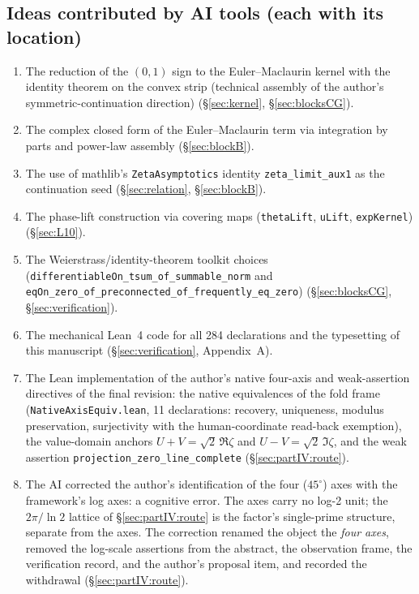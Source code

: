\documentclass{article}
\newcommand{\zt}{\zeta}
\begin{document}
\subsection*{Ideas contributed by AI tools (each with its location)}
\begin{enumerate}
\item The reduction of the $(0,1)$ sign to the Euler--Maclaurin kernel with
the identity theorem on the convex strip (technical assembly of the
author's symmetric-continuation direction) (\S\ref{sec:kernel},
\S\ref{sec:blocksCG}).
\item The complex closed form of the Euler--Maclaurin term via integration
by parts and power-law assembly (\S\ref{sec:blockB}).
\item The use of mathlib's \texttt{ZetaAsymptotics} identity
\texttt{zeta\_limit\_aux1} as the continuation seed (\S\ref{sec:relation},
\S\ref{sec:blockB}).
\item The phase-lift construction via covering maps
(\texttt{thetaLift}, \texttt{uLift}, \texttt{expKernel})
(\S\ref{sec:L10}).
\item The Weierstrass/identity-theorem toolkit choices
(\texttt{differentiableOn\_tsum\_of\_summable\_norm} and
\texttt{eqOn\_zero\_of\_preconnected\_of\_frequently\_eq\_zero})
(\S\ref{sec:blocksCG}, \S\ref{sec:verification}).
\item The mechanical Lean~4 code for all 284 declarations and the
typesetting of this manuscript (\S\ref{sec:verification}, Appendix~A).
\item The Lean implementation of the author's native four-axis and
weak-assertion directives of the final revision: the native
equivalences of the fold frame (\texttt{NativeAxisEquiv.lean}, 11
declarations: recovery, uniqueness, modulus preservation, surjectivity
with the human-coordinate read-back exemption), the value-domain
anchors $U+V=\sqrt2\,\Re\zt$ and $U-V=\sqrt2\,\Im\zt$, and the weak
assertion \texttt{projection\_zero\_line\_complete}
(\S\ref{sec:partIV:route}).
\item The AI corrected the author's identification of the four
($45^\circ$) axes with the framework's log axes: a cognitive error.
The axes carry no log-2 unit; the $2\pi/\ln 2$ lattice of
\S\ref{sec:partIV:route} is the factor's single-prime structure,
separate from the axes. The correction renamed the object the
\emph{four axes}, removed the log-scale assertions from the abstract,
the observation frame, the verification record, and the author's
proposal item, and recorded the withdrawal
(\S\ref{sec:partIV:route}).
\end{enumerate}
\end{document}
